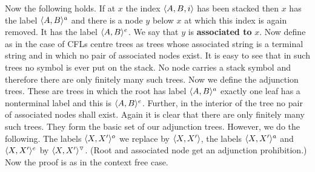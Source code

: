 Now the following holds.  If at $x$ the index $\langle A, B, i\rangle$
has been stacked then $x$ has the label $\langle A, B\rangle^a$ and there
is a node $y$ below $x$ at which this index is again removed.
It has the label $\langle A, B\rangle^e$. We say that $y$ is
\textbf{associated to} $x$. Now define as in the case of CFLs
centre trees as trees whose associated string
is a terminal string and in which no pair of associated
nodes exist. It is easy to see that in such trees no symbol
is ever put on the stack. No node carries a stack symbol and
therefore there are only finitely many such trees. Now we
define the adjunction trees. These are trees in which the
root has label $\langle A, B\rangle^a$ exactly one leaf has a nonterminal
label and this is $\langle A, B\rangle^e$. Further, in the interior
of the tree no pair of associated nodes shall exist. Again it
is clear that there are only finitely many such trees. They
form the basic set of our adjunction trees. However, we do
the following.  The labels $\langle X, X'\rangle^o$ we replace by
$\langle X,X'\rangle$, the labels $\langle X,X'\rangle^a$ and $\langle X,X'\rangle^e$
by $\langle X,X'\rangle^{\triangledown}$. (Root and associated node
get an adjunction prohibition.) Now the proof is as in the
context free case.


